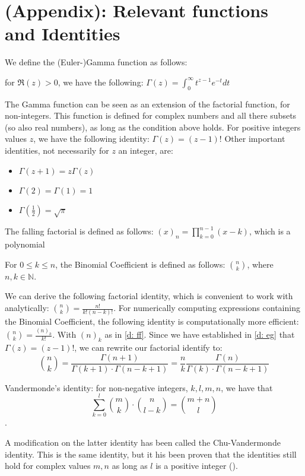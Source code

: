 \section{(Appendix): Relevant functions and Identities}\label{s:appendices}
We define the (Euler-)Gamma function as follows:
\begin{definition}\label{d: eg}
    for \(\Re(z) > 0\), we have the following: \(\Gamma(z) = \int_{0}^{\infty} t^{z-1} e^{-t} dt\)
\end{definition}

The Gamma function can be seen as an extension of the factorial function, for non-integers. This function is defined for complex numbers and all there subsets (so also real numbers), as long as the condition above holds. For positive integers values \(z\), we have the following identity: \(\Gamma(z) = (z - 1)!\)
Other important identities, not necessarily for \(z\) an integer, are: 
\begin{itemize}
    \item \(\Gamma(z + 1) = z \Gamma(z)\)
    \item \(\Gamma(2) = \Gamma(1) = 1\)
    \item \(\Gamma(\frac{1}{2}) = \sqrt{\pi}\)
\end{itemize}

\begin{definition}\label{d: ff}
    The falling factorial is defined as follows: \((x)_n = \prod_{k = 0}^{n - 1} (x - k)\), which is a polynomial
\end{definition}
\begin{definition}
    For \(0 \leq k \leq n\), the Binomial Coefficient is defined as follows: \(\binom{n}{k}\), where \(n, k \in \mathbb{N}\).
\end{definition}
We can derive the following factorial identity, which is convenient to work with analytically: \(\binom{n}{k} = \frac{n!}{k! (n - k)!}\).
For numerically computing expressions containing the Binomial Coefficient, the following identity is computationally more efficient: \(\binom{n}{k} = \frac{(n)_k}{k!}\). With \((n)_k\) as in \ref{d: ff}.
Since we have established in \ref{d: eg} that \(\Gamma(z) = (z - 1)!\), we can rewrite our factorial identify to:
\[\binom{n}{k} = \frac{\Gamma(n + 1)}{\Gamma(k + 1) \cdot \Gamma( n - k  + 1)} = \frac{n}{k}\frac{\Gamma(n)}{\Gamma(k) \cdot \Gamma(n - k + 1)}\]

\begin{definition}
    Vandermonde's identity: for non-negative integers, \(k, l, m, n\), we have that \[\sum_{k = 0}^{l} \binom{m}{k} \cdot \binom{n}{l - k} = \binom{m + n}{l}\].
\end{definition}
A modification on the latter identity has been called the Chu-Vandermonde identity. This is the same identity, but it his been proven that the identities still hold for complex values \(m, n\) as long as \(l\) is a positive integer (\cite{askey75}).

